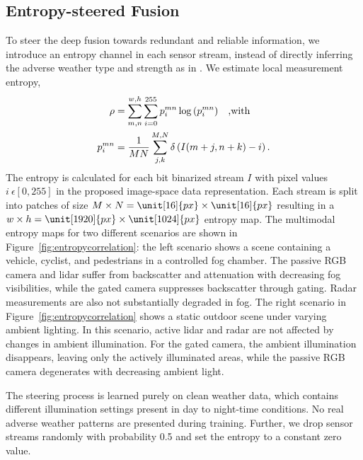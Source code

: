 \subsection{Entropy-steered Fusion}\label{sec:entropy}
To steer the deep fusion towards redundant and reliable information, we introduce an entropy channel in each sensor stream, instead of directly inferring the adverse weather type and strength as in \cite{fogest2014,tarel2010improved}. We estimate local measurement entropy,
\vspace{-14pt}
\begin{equation}\label{eq:entropy}
\begin{aligned}
\rho & = \sum_{m,n}^{w,h}\sum_{i=0}^{255} p_i^{mn} \log\left(p_i^{mn}\right) \;\;\; \text{,with} \\\vspace{-0.3em}
p_i^{mn} & =\frac{1}{MN}\sum_{j,k}^{M,N} \delta\left(I(m+j,n+k)-i\right).
\end{aligned}
\vspace{-1.3em}
\end{equation}
The entropy is calculated for each \unit[8]{bit} binarized stream $I$ with pixel values $i\ \epsilon\left[0,255\right]$ in the proposed image-space data representation. Each stream is split into patches of size $M \times N = \unit[16]{px} \times \unit[16]{px}$ resulting in a $w \times h = \unit[1920]{px}\times\unit[1024]{px}$ entropy map. The multimodal entropy maps for two different scenarios are shown in Figure~\ref{fig:entropycorrelation}: the left scenario shows a scene containing a vehicle, cyclist, and pedestrians in a controlled fog chamber. The passive RGB camera and lidar suffer from backscatter and attenuation with decreasing fog visibilities, while the gated camera suppresses backscatter through gating. Radar measurements are also not substantially degraded in fog. The right scenario in Figure~\ref{fig:entropycorrelation} shows a static outdoor scene under varying ambient lighting. In this scenario, active lidar and radar are not affected by changes in ambient illumination. For the gated camera, the ambient illumination disappears, leaving only the actively illuminated areas, while the passive RGB camera degenerates with decreasing ambient light. 

The steering process is learned purely on clean weather data, which contains different illumination settings present in day to night-time conditions. No real adverse weather patterns are presented during training. Further, we drop sensor streams randomly with probability 0.5 and set the entropy to a constant zero value. 


